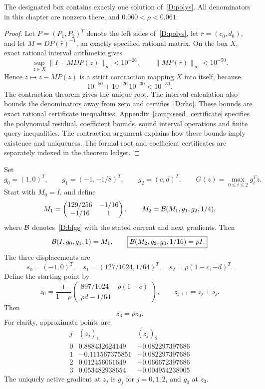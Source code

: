 \begin{lemma}\label{D:root}
The designated box contains exactly one solution of~\eqref{D:polys}. All denominators in this chapter are nonzero there, and $0.060<\rho<0.061$.
\end{lemma}
\begin{proof}
Let $P=(P_1,P_2)^T$ denote the left sides of~\eqref{D:polys}, let $\bar r=(c_0,d_0)$, and let $M=DP(\bar r)^{-1}$, an exactly specified rational matrix. On the box $X$, exact rational interval arithmetic gives
\[
 \sup_{z\in X}\|I-MDP(z)\|_\infty<10^{-26},
 \qquad\|MP(\bar r)\|_\infty<10^{-50}.
\]
Hence $z\mapsto z-MP(z)$ is a strict contraction mapping $X$ into itself, because
\[
 10^{-50}+10^{-26}\,10^{-30}<10^{-30}.
\]
The contraction theorem gives the unique root. The interval calculation also bounds the denominators away from zero and certifies~\eqref{D:rho}. These bounds are exact rational certificate inequalities. Appendix~\ref{comp:seed_certificate} specifies the polynomial residual, coefficient bounds, sound interval operations and finite query inequalities. The contraction argument explains how these bounds imply existence and uniqueness. The formal root and coefficient certificates are separately indexed in the theorem ledger.
\end{proof}

Set
\[
 g_0=(1,0)^T,\qquad g_1=(-1,-1/8)^T,\qquad g_2=(c,d)^T,
 \qquad G(z)=\max_{0\le i\le2}g_i^Tz.
\]
Start with $M_0=I$, and define
\[
 M_1=\begin{pmatrix}129/256&-1/16\\-1/16&1\end{pmatrix},
 \qquad M_2=\mathcal B(M_1,g_1,g_2,1/4),
\]
where $\mathcal B$ denotes~\eqref{D:bfgs} with the stated current and next gradients. Then
\begin{equation}\label{D:closure}
 \mathcal B(I,g_0,g_1,1)=M_1,\qquad
 \boxed{\mathcal B(M_2,g_2,g_0,1/16)=\rho I.}
\end{equation}
The three displacements are
\begin{equation}\label{D:steps}
 s_0=(-1,0)^T,\quad s_1=(127/1024,1/64)^T,\quad
 s_2=\rho(1-c,-d)^T.
\end{equation}
Define the starting point by
\begin{equation}\label{D:x0}
 z_0=\frac1{1-\rho}
 \begin{pmatrix}897/1024-\rho(1-c)\\ \rho d-1/64\end{pmatrix},
 \qquad z_{j+1}=z_j+s_j.
\end{equation}
Then
\[
 \boxed{z_3=\rho z_0.}
\]
For clarity, approximate points are
\[
\begin{array}{c|rr}
 j& (z_j)_1&(z_j)_2\\\hline
0& 0.888432624149&-0.082297397686\\
1&-0.111567375851&-0.082297397686\\
2& 0.012456061649&-0.066672397686\\
3& 0.053482938654&-0.004954238005
\end{array}
\]
The uniquely active gradient at $z_j$ is $g_j$ for $j=0,1,2$, and $g_0$ at $z_3$.

